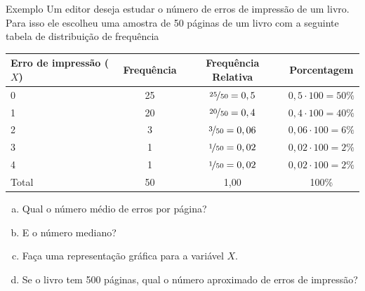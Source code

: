 \documentclass[8pt]{beamer}
\begin{document}
\begin{frame}{Exemplo}
 Um editor deseja estudar o número de erros de impressão de um livro. Para isso ele escolheu uma amostra de 50 páginas de um livro com a seguinte tabela de distribuição de frequência
 
 {\tiny
 \begin{table}
  \centering
  \begin{tabular}{l|ccc}
  \toprule[0.05cm]
    Erro de impressão ($X$) & Frequência & Frequência Relativa & Porcentagem \\ \midrule[0.05cm]
    0 & 25 & $\nicefrac{25}{50}=0,5$ & $0,5\cdot 100=50\%$\\
    1 & 20 & $\nicefrac{20}{50}=0,4$ & $0,4\cdot 100=40\%$\\
    2 & 3 & $\nicefrac{3}{50}=0,06$ & $0,06\cdot 100=6\%$\\
    3 & 1 & $\nicefrac{1}{50}=0,02$ & $0,02\cdot 100=2\%$\\
    4 & 1 & $\nicefrac{1}{50}=0,02$ & $0,02\cdot 100=2\%$\\ \midrule[0.05cm]
    Total & 50 & 1,00 & 100\% \\ \bottomrule[0.05cm]
  \end{tabular}
 \end{table}
 }
 
 \begin{enumerate}[a)]
  \item Qual o número médio de erros por página?
  \item E o número mediano?
  \item Faça uma representação gráfica para a variável $X$.
  \item Se o livro tem 500 páginas, qual o número aproximado de erros de impressão?
 \end{enumerate}
\end{frame}
\end{document}
